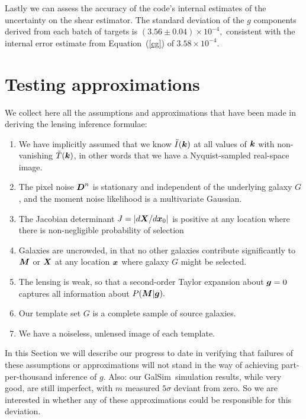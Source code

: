 \documentclass[11pt,preprint,flushrt]{aastex}
\def\eqq#1{Equation~(\ref{#1})}
\newcommand{\vecD}{\mbox{\boldmath $D$}}
\newcommand{\vecX}{\mbox{\boldmath $X$}}
\newcommand{\vecg}{\mbox{\boldmath $g$}}
\newcommand{\vecM}{\mbox{\boldmath $M$}}
\newcommand{\vecx}{\mbox{\boldmath $x$}}
\newcommand{\veck}{\mbox{\boldmath $k$}}
\newcommand{\galsim}{{\sc GalSim}}
\newcommand\edit[1]{#1}
\begin{document}
Lastly we can assess the accuracy of the code's internal estimates of
the uncertainty on the shear estimator.  The standard deviation of the
$g$ components derived from each batch of targets is
\edit{$(3.56\pm0.04)\times10^{-4},$  consistent with the internal error
estimate from \eqq{cg} of $3.58\times10^{-4}.$}

\section{Testing approximations}
\label{approx}
We collect here all the assumptions and approximations that have been made
in deriving the lensing inference formulae:
\begin{enumerate}
\item We have implicitly assumed that we know $\tilde I(\veck)$ at all
  values of $\veck$ with non-vanishing $\tilde T(\veck)$,  in other
  words that we have a Nyquist-sampled real-space image.
\label{nyquistitem}

\item The pixel noise $\vecD^n$ is stationary and independent of the
  underlying galaxy $G$, and the moment noise likelihood is a
  multivariate Gaussian.
\label{bgnoiseitem}

\item The Jacobian determinant $J = |d\vecX/d\vecx_0|$ 
  is positive at any location where there is
  non-negligible probability of selection
\label{convexitem}

\item Galaxies are uncrowded, in that
  no other galaxies contribute significantly to $\vecM$ or $\vecX$ at
  any location $\vecx$ where galaxy $G$ might be selected.
\label{uncrowdeditem}

\item The lensing is weak, so that
  a second-order Taylor expansion about $\vecg=0$ captures all
  information about $P(\vecM | \vecg).$
\label{weakitem}

\item Our template set $G$ is a complete sample of source galaxies.
\label{sampleitem}

\item We have a noiseless, unlensed image of each template.
\label{noiselessitem}

\end{enumerate}
In this Section we will describe our progress to date in verifying
that failures of these assumptions or approximations will not stand in
the way of achieving part-per-thousand inference of \vecg. 
\edit{Also: our \galsim\ simulation results, while very good, are still
imperfect, with $m$ measured $5\sigma$ deviant from zero.  So we are
interested in whether any of these approximations could be responsible
for this deviation.}
\end{document}
